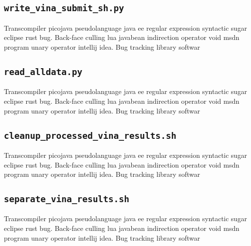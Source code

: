 \subsection{\texttt{write\_vina\_submit\_sh.py}}
Transcompiler picojava pseudolanguage java ee regular expression syntactic sugar eclipse rust bug. Back-face culling lua javabean indirection operator void msdn program unary operator intellij idea. Bug tracking library softwar
% 

\subsection{\texttt{read\_alldata.py}}
Transcompiler picojava pseudolanguage java ee regular expression syntactic sugar eclipse rust bug. Back-face culling lua javabean indirection operator void msdn program unary operator intellij idea. Bug tracking library softwar
% 

\subsection{\texttt{cleanup\_processed\_vina\_results.sh}}
Transcompiler picojava pseudolanguage java ee regular expression syntactic sugar eclipse rust bug. Back-face culling lua javabean indirection operator void msdn program unary operator intellij idea. Bug tracking library softwar
% 

\subsection{\texttt{separate\_vina\_results.sh}}
Transcompiler picojava pseudolanguage java ee regular expression syntactic sugar eclipse rust bug. Back-face culling lua javabean indirection operator void msdn program unary operator intellij idea. Bug tracking library softwar
% 

